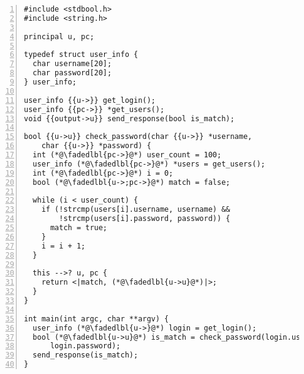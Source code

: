 
\begin{lstlisting}[float, style=dlmc, numbers=left, caption={Labelled password checker example}, label=example:code:check_password-explicit]
#include <stdbool.h>
#include <string.h>

principal u, pc;

typedef struct user_info {
  char username[20];
  char password[20];
} user_info;

user_info {{u->}} get_login();
user_info {{pc->}} *get_users();
void {{output->u}} send_response(bool is_match);

bool {{u->u}} check_password(char {{u->}} *username,
    char {{u->}} *password) {
  int (*@\fadedlbl{pc->}@*) user_count = 100;
  user_info (*@\fadedlbl{pc->}@*) *users = get_users();
  int (*@\fadedlbl{pc->}@*) i = 0;
  bool (*@\fadedlbl{u->;pc->}@*) match = false;

  while (i < user_count) {
    if (!strcmp(users[i].username, username) &&
        !strcmp(users[i].password, password)) {
      match = true;
    }
    i = i + 1;
  }

  this -->? u, pc {
    return <|match, (*@\fadedlbl{u->u}@*)|>;
  }
}

int main(int argc, char **argv) {
  user_info (*@\fadedlbl{u->}@*) login = get_login();
  bool (*@\fadedlbl{u->u}@*) is_match = check_password(login.username,
      login.password);
  send_response(is_match);
}
\end{lstlisting}
